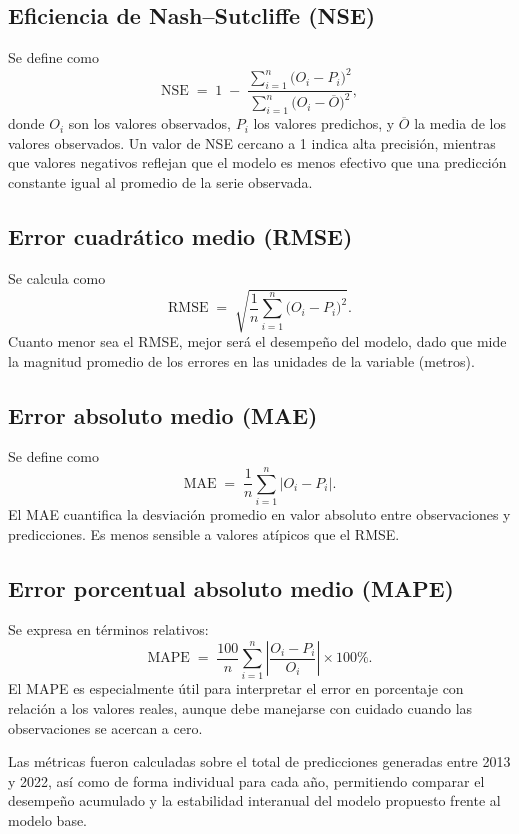 \subsection{Eficiencia de Nash–Sutcliffe (NSE)}
Se define como
\[
\text{NSE} \;=\; 1 \;-\; \frac{\displaystyle \sum_{i=1}^n \bigl(O_i - P_i\bigr)^2}{\displaystyle \sum_{i=1}^n \bigl(O_i - \overline{O}\bigr)^2},
\]
donde $O_i$ son los valores observados, $P_i$ los valores predichos, y $\overline{O}$ la media de los valores observados. Un valor de NSE cercano a 1 indica alta precisión, mientras que valores negativos reflejan que el modelo es menos efectivo que una predicción constante igual al promedio de la serie observada.

\subsection{Error cuadrático medio (RMSE)}
Se calcula como
\[
\text{RMSE} \;=\; \sqrt{\frac{1}{n} \sum_{i=1}^n \bigl(O_i - P_i\bigr)^2}.
\]
Cuanto menor sea el RMSE, mejor será el desempeño del modelo, dado que mide la magnitud promedio de los errores en las unidades de la variable (metros).

\subsection{Error absoluto medio (MAE)}
Se define como
\[
\text{MAE} \;=\; \frac{1}{n} \sum_{i=1}^n \bigl\lvert O_i - P_i \bigr\rvert.
\]
El MAE cuantifica la desviación promedio en valor absoluto entre observaciones y predicciones. Es menos sensible a valores atípicos que el RMSE.

\subsection{Error porcentual absoluto medio (MAPE)}
Se expresa en términos relativos:
\[
\text{MAPE} \;=\; \frac{100}{n} \sum_{i=1}^n \left\lvert \frac{O_i - P_i}{O_i} \right\rvert \times 100\%.
\]
El MAPE es especialmente útil para interpretar el error en porcentaje con relación a los valores reales, aunque debe manejarse con cuidado cuando las observaciones se acercan a cero.

Las métricas fueron calculadas sobre el total de predicciones generadas entre 2013 y 2022, así como de forma individual para cada año, permitiendo comparar el desempeño acumulado y la estabilidad interanual del modelo propuesto frente al modelo base.